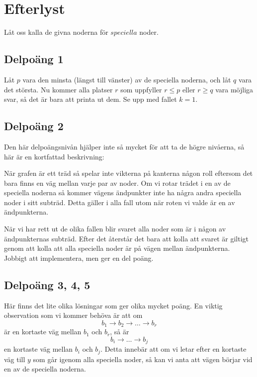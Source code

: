 \section*{Efterlyst}

Låt oss kalla de givna noderna för $\textit{speciella}$ noder.

\subsection*{Delpoäng 1}

Låt $p$ vara den minsta (längst till vänster) av de speciella noderna, och låt $q$ vara det största.
Nu kommer alla platser $r$ som uppfyller $r \leq p$ eller $r \geq q$ vara möjliga svar, så det är bara att printa ut dem.
Se upp med fallet $k = 1$.

\subsection*{Delpoäng 2}

Den här delpoängsnivån hjälper inte så mycket för att ta de högre nivåerna, så här är en kortfattad beskrivning:

När grafen är ett träd så spelar inte vikterna på kanterna någon roll eftersom det bara finns en väg mellan varje par av noder.
Om vi rotar trädet i en av de speciella noderna så kommer vägens ändpunkter inte ha några andra speciella noder i sitt subträd.
Detta gäller i alla fall utom när roten vi valde är en av ändpunkterna.

När vi har rett ut de olika fallen blir svaret alla noder som är i någon av ändpunkternas subträd.
Efter det återstår det bara att kolla att svaret är giltigt genom att kolla att alla speciella noder är på vägen mellan ändpunkterna.
Jobbigt att implementera, men ger en del poäng.

\subsection*{Delpoäng 3, 4, 5}

Här finns det lite olika lösningar som ger olika mycket poäng. En viktig observation som vi kommer behöva är att om 
$$b_1 \rightarrow b_2 \rightarrow \dots \rightarrow b_r$$
är en kortaste väg mellan $b_1$ och $b_r$, så är 
$$b_i \rightarrow \dots \rightarrow b_j$$
en kortaste väg mellan $b_i$ och $b_j$.
Detta innebär att om vi letar efter en kortaste väg till $y$ som går igenom alla speciella noder, så kan vi anta att vägen börjar vid en av de speciella noderna.

